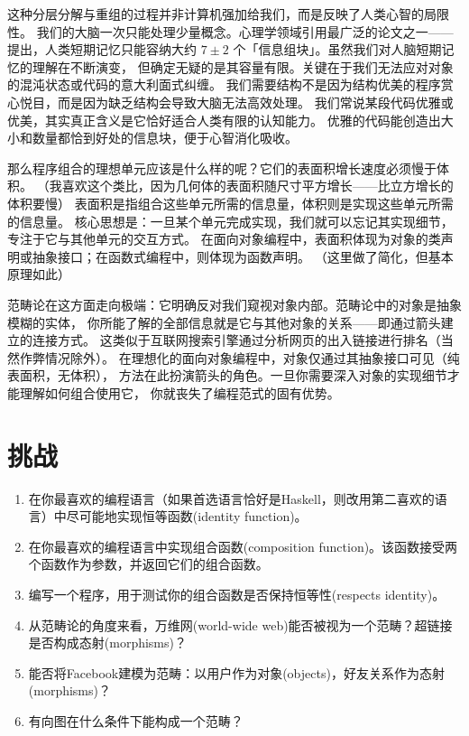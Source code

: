 这种分层分解与重组的过程并非计算机强加给我们，而是反映了人类心智的局限性。
我们的大脑一次只能处理少量概念。心理学领域引用最广泛的论文之一——
提出，人类短期记忆只能容纳大约 $7 \pm 2$ 个「信息组块」。虽然我们对人脑短期记忆的理解在不断演变，
但确定无疑的是其容量有限。关键在于我们无法应对对象的混沌状态或代码的意大利面式纠缠。
我们需要结构不是因为结构优美的程序赏心悦目，而是因为缺乏结构会导致大脑无法高效处理。
我们常说某段代码优雅或优美，其实真正含义是它恰好适合人类有限的认知能力。
优雅的代码能创造出大小和数量都恰到好处的信息块，便于心智消化吸收。

那么程序组合的理想单元应该是什么样的呢？它们的表面积增长速度必须慢于体积。
（我喜欢这个类比，因为几何体的表面积随尺寸平方增长——比立方增长的体积要慢）
表面积是指组合这些单元所需的信息量，体积则是实现这些单元所需的信息量。
核心思想是：一旦某个单元完成实现，我们就可以忘记其实现细节，专注于它与其他单元的交互方式。
在面向对象编程中，表面积体现为对象的类声明或抽象接口；在函数式编程中，则体现为函数声明。
（这里做了简化，但基本原理如此）

范畴论在这方面走向极端：它明确反对我们窥视对象内部。范畴论中的对象是抽象模糊的实体，
你所能了解的全部信息就是它与其他对象的关系——即通过箭头建立的连接方式。
这类似于互联网搜索引擎通过分析网页的出入链接进行排名（当然作弊情况除外）。
在理想化的面向对象编程中，对象仅通过其抽象接口可见（纯表面积，无体积），
方法在此扮演箭头的角色。一旦你需要深入对象的实现细节才能理解如何组合使用它，
你就丧失了编程范式的固有优势。

\section{挑战}

\begin{enumerate}
  \tightlist
  \item
        在你最喜欢的编程语言（如果首选语言恰好是Haskell，则改用第二喜欢的语言）中尽可能地实现恒等函数(identity function)。
  \item
        在你最喜欢的编程语言中实现组合函数(composition function)。该函数接受两个函数作为参数，并返回它们的组合函数。
  \item
        编写一个程序，用于测试你的组合函数是否保持恒等性(respects identity)。
  \item
        从范畴论的角度来看，万维网(world-wide web)能否被视为一个范畴？超链接是否构成态射(morphisms)？
  \item
        能否将Facebook建模为范畴：以用户作为对象(objects)，好友关系作为态射(morphisms)？
  \item
        有向图在什么条件下能构成一个范畴？
\end{enumerate}